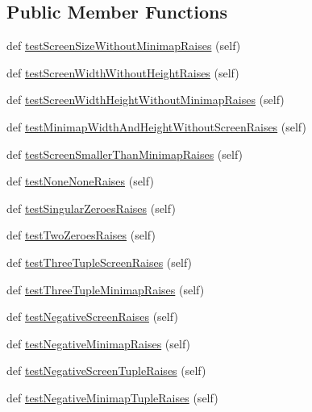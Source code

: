 \subsection*{Public Member Functions}
\begin{DoxyCompactItemize}
\item 
def \mbox{\hyperlink{classpysc2_1_1lib_1_1features__test_1_1_dimensions_test_a656658d118ecf0dec068a5f1f840480a}{test\+Screen\+Size\+Without\+Minimap\+Raises}} (self)
\item 
def \mbox{\hyperlink{classpysc2_1_1lib_1_1features__test_1_1_dimensions_test_a5d54ae68a70ede7e77ebc5a82f9bb363}{test\+Screen\+Width\+Without\+Height\+Raises}} (self)
\item 
def \mbox{\hyperlink{classpysc2_1_1lib_1_1features__test_1_1_dimensions_test_a98381d48e02f0575e16df437120ad0b6}{test\+Screen\+Width\+Height\+Without\+Minimap\+Raises}} (self)
\item 
def \mbox{\hyperlink{classpysc2_1_1lib_1_1features__test_1_1_dimensions_test_a477eb9b53b64219aa10f5460a1e2735a}{test\+Minimap\+Width\+And\+Height\+Without\+Screen\+Raises}} (self)
\item 
def \mbox{\hyperlink{classpysc2_1_1lib_1_1features__test_1_1_dimensions_test_af6f69ee9ae5eb17bc7e324caa7add776}{test\+Screen\+Smaller\+Than\+Minimap\+Raises}} (self)
\item 
def \mbox{\hyperlink{classpysc2_1_1lib_1_1features__test_1_1_dimensions_test_a68a0e81f9af4953ef8e51e2376296c86}{test\+None\+None\+Raises}} (self)
\item 
def \mbox{\hyperlink{classpysc2_1_1lib_1_1features__test_1_1_dimensions_test_a715543385b64f77ed16e6370fbba56fd}{test\+Singular\+Zeroes\+Raises}} (self)
\item 
def \mbox{\hyperlink{classpysc2_1_1lib_1_1features__test_1_1_dimensions_test_a415323bb2471aecc5255d210cbd99801}{test\+Two\+Zeroes\+Raises}} (self)
\item 
def \mbox{\hyperlink{classpysc2_1_1lib_1_1features__test_1_1_dimensions_test_a43f03496b5f601bfcd4a2b43d16bd165}{test\+Three\+Tuple\+Screen\+Raises}} (self)
\item 
def \mbox{\hyperlink{classpysc2_1_1lib_1_1features__test_1_1_dimensions_test_a9bf1bf5fd35bf14528343c64e92cfa3e}{test\+Three\+Tuple\+Minimap\+Raises}} (self)
\item 
def \mbox{\hyperlink{classpysc2_1_1lib_1_1features__test_1_1_dimensions_test_a6818938975cbcea85dcc17ee1d506053}{test\+Negative\+Screen\+Raises}} (self)
\item 
def \mbox{\hyperlink{classpysc2_1_1lib_1_1features__test_1_1_dimensions_test_a689adbba28df393a9b16b36413b08d29}{test\+Negative\+Minimap\+Raises}} (self)
\item 
def \mbox{\hyperlink{classpysc2_1_1lib_1_1features__test_1_1_dimensions_test_a4fa9ba1d024fbee643cca67ed215627d}{test\+Negative\+Screen\+Tuple\+Raises}} (self)
\item 
def \mbox{\hyperlink{classpysc2_1_1lib_1_1features__test_1_1_dimensions_test_ac762a20913b445f3137cf72191edff70}{test\+Negative\+Minimap\+Tuple\+Raises}} (self)
\end{DoxyCompactItemize}


